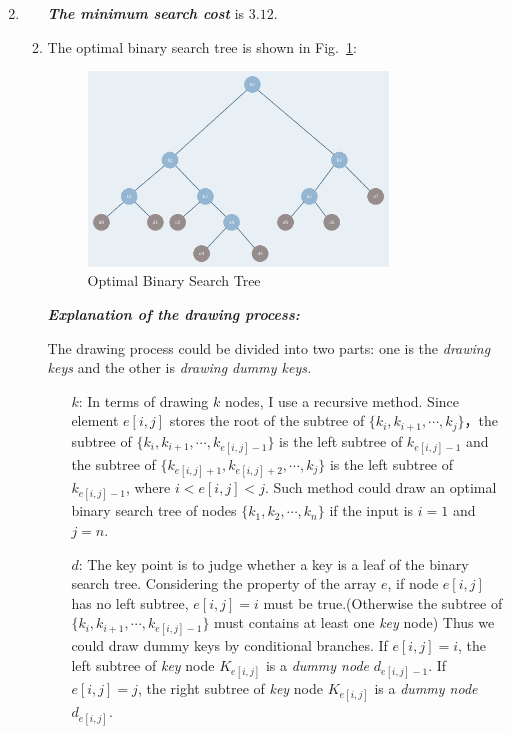 \documentclass[12pt,a4paper]{article}
\makeatletter
\newtheorem*{solution}{Solution}
\theoremstyle{definition}
\renewenvironment{solution}[1][Solution] {\par\pushQED{\qed}\normalfont\topsep6\p@\@plus6\p@\relax\trivlist\item[\hskip\labelsep\bfseries#1\@addpunct{.}]\ignorespaces}{\popQED\endtrivlist\@endpefalse} \makeatother
\makeatother
\begin{document}
\begin{enumerate}
\begin{solution}
\begin{enumerate}
		            \textbf{\textit{The minimum search cost}} is \emph{$3.12$}.
		            
		            \item
		            The optimal binary search tree is shown in Fig.~\ref{Fig-Tree}:
		            
                    \begin{figure}[htbp]
                        \centering \includegraphics[width=0.8\textwidth]{Fig-Tree.pdf}
                        \caption{Optimal Binary Search Tree}\label{Fig-Tree}
                    \end{figure}
		            
		            \textbf{\textit{Explanation of the drawing process:}} 
		            
		            The drawing process could be divided into two parts: one is the \emph{drawing keys} and the other is \emph{drawing dummy keys.}
		            
		            \begin{enumerate}
		                \item [$k$:]
		                In terms of drawing $k$ nodes, I use a recursive method. Since element $e[i,j]$ stores the root of the subtree of $\{k_i,k_{i+1},\cdots,k_j\}$，the subtree of $\{k_i,k_{i+1},\cdots,k_{e[i,j]-1}\}$ is the left subtree of $k_{e[i,j]-1}$ and the subtree of $\{k_{e[i,j]+1},k_{e[i,j]+2},\cdots,k_{j}\}$ is the left subtree of $k_{e[i,j]-1}$, where $i<e[i,j]<j$. Such method could draw an optimal binary search tree of nodes $\{k_1,k_{2},\cdots,k_n\}$ if the input is $i=1$ and $j=n$.
		                
		                \item [$d$:]
		                The key point is to judge whether a key is a leaf of the binary search tree. Considering the property of the array $e$, if node $e[i,j]$ has no left subtree, $e[i,j]=i$ must be true.(Otherwise the subtree of $\{k_i,k_{i+1},\cdots,k_{e[i,j]-1}\}$ must contains at least one \emph{key} node)
		                Thus we could draw dummy keys by conditional branches. If $e[i,j]=i$, the left subtree of \emph{key} node $K_{e[i,j]}$ is a \emph{dummy node} $d_{e[i,j]-1}$. If $e[i,j]=j$, the right subtree of \emph{key} node $K_{e[i,j]}$ is a \emph{dummy node} $d_{e[i,j]}$.
		            \end{enumerate}


\end{enumerate}
\end{solution}
\end{enumerate}
\end{document}
